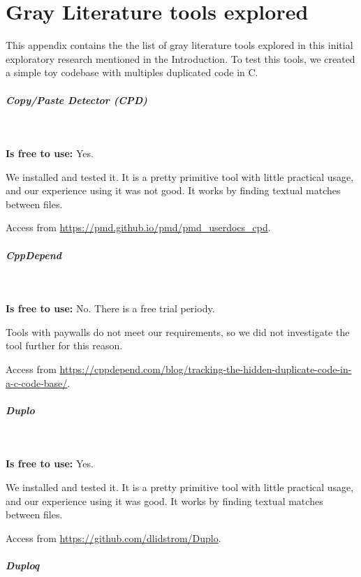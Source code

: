 \chapter{Gray Literature tools explored}

\label{app:gray}


This appendix contains the the list of gray literature tools 
explored in this initial exploratory research mentioned
in the Introduction. To test this tools, we created a simple 
toy codebase with multiples duplicated code in C.

\paragraph{Copy/Paste Detector (CPD)} 

\

\textbf{Is free to use:} Yes.

We installed and tested it. It is a pretty primitive tool 
with little practical usage, and our experience using it 
was not good. It works by finding textual matches between files.

Access from \url{https://pmd.github.io/pmd/pmd_userdocs_cpd}.

\paragraph{CppDepend}

\

\textbf{Is free to use:} No. There is a free trial periody.

Tools with paywalls do not meet our requirements, 
so we did not investigate the tool further for this reason.

Access from 
\url{https://cppdepend.com/blog/tracking-the-hidden-duplicate-code-in-a-c-code-base/}.

\paragraph{Duplo}

\

\textbf{Is free to use:} Yes.

We installed and tested it. It is a pretty primitive tool 
with little practical usage, and our experience using it was good. 
It works by finding textual matches between files.

Access from
\url{https://github.com/dlidstrom/Duplo}.

\paragraph{Duploq}

